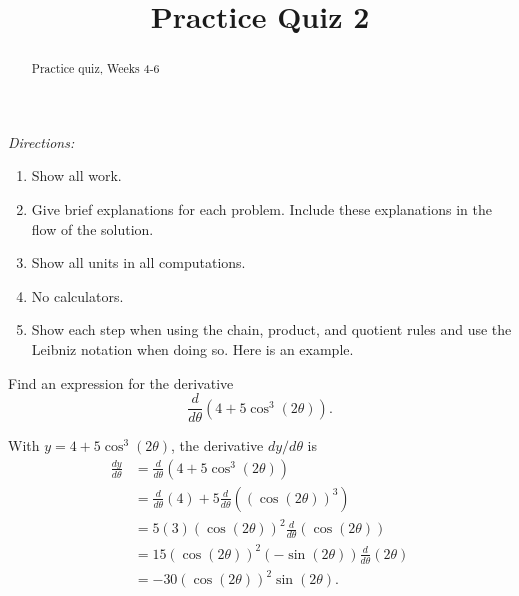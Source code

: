 \documentclass{ximera}
\title{Practice Quiz 2}
\begin{document}
\begin{abstract}
Practice quiz, Weeks 4-6
\end{abstract}
\maketitle

\emph{Directions:}

\begin{enumerate}
\item Show all work.

\item Give brief explanations for each problem. Include these explanations in the flow of the solution.

\item Show all units in all computations.

\item No calculators.

\item Show each step when using the chain, product, and quotient rules and use the Leibniz notation when doing so. Here is an example.

\end{enumerate}

\begin{example} \label{Eg4thghgddfg}
Find an expression for the derivative
\[
    \frac{d}{d\theta}\left( 4 + 5\cos^3(2\theta) \right) .
\]

\begin{explanation}
With $y=4 + 5\cos^3(2\theta)$, the derivative $dy/d\theta$ is 
\begin{align*}
\frac{dy}{d\theta} &= \frac{d}{d\theta}\left(   4 + 5\cos^3(2\theta)   \right) \\
                          & = \frac{d}{d\theta}\left( 4 \right) + 5\frac{d}{d\theta}\left( \left( \cos(2\theta)  \right)^3  \right) \\
                           &=  5(3) (\cos(2\theta))^2 \frac{d}{d\theta}\left(  \cos (2\theta) \right) \\
                          &= 15(\cos(2\theta))^2 (-\sin(2\theta))\frac{d}{d\theta}(2\theta) \\
                           &= -30(\cos(2\theta))^2\sin(2\theta) .
\end{align*}


\end{explanation}
\end{example}
\end{document}

